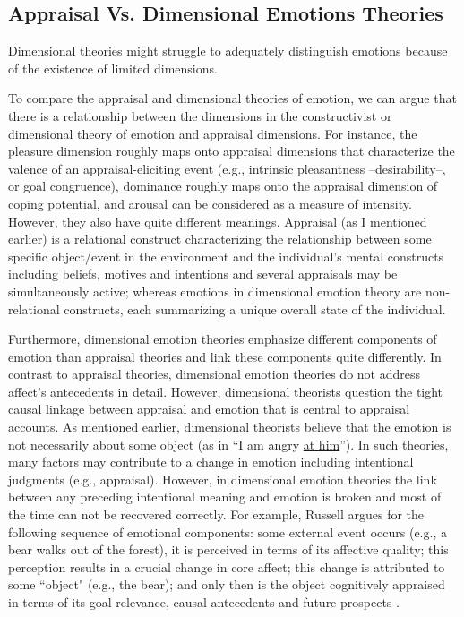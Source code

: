 \documentclass[11pt]{article}
\begin{document}
\subsection{Appraisal Vs. Dimensional Emotions Theories}

Dimensional theories might struggle to adequately distinguish emotions because
of the existence of limited dimensions.

To compare the appraisal and dimensional theories of emotion, we can argue that
there is a relationship between the dimensions in the constructivist or
dimensional theory of emotion and appraisal dimensions. For instance, the
pleasure dimension roughly maps onto appraisal dimensions that characterize the
valence of an appraisal-eliciting event (e.g., intrinsic pleasantness
--desirability--, or goal congruence), dominance roughly maps onto the appraisal
dimension of coping potential, and arousal can be considered as a measure of
intensity. However, they also have quite different meanings. Appraisal (as I
mentioned earlier) is a relational construct characterizing the relationship
between some specific object/event in the environment and the individual's
mental constructs including beliefs, motives and intentions and several
appraisals may be simultaneously active; whereas emotions in dimensional emotion
theory are non-relational constructs, each summarizing a unique overall state of
the individual.

Furthermore, dimensional emotion theories emphasize different components of
emotion than appraisal theories and link these components quite differently.
In contrast to appraisal theories, dimensional emotion theories do not address
affect’s antecedents in detail. However, dimensional theorists question the
tight causal linkage between appraisal and emotion that is central to appraisal
accounts. As mentioned earlier, dimensional theorists believe that the emotion
is not necessarily about some object (as in ``I am angry \underline{at him}'').
In such theories, many factors may contribute to a change in emotion including
intentional judgments (e.g., appraisal). However, in dimensional emotion
theories the link between any preceding intentional meaning and emotion is
broken and most of the time can not be recovered correctly. For example, Russell
argues for the following sequence of emotional components: some external event
occurs (e.g., a bear walks out of the forest), it is perceived in terms of its
affective quality; this perception results in a crucial change in core affect;
this change is attributed to some ``object" (e.g., the bear); and only then is
the object cognitively appraised in terms of its goal relevance, causal
antecedents and future prospects \cite{marsella:computational-models}.
\end{document}
